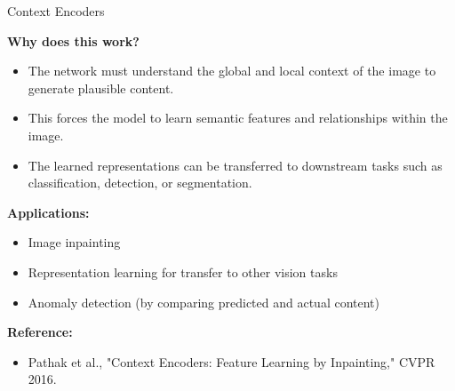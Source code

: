 \begin{frame}[allowframebreaks]{Context Encoders}
    \framebreak

    \vspace{0.5em}
    \textbf{Why does this work?}
    \begin{itemize}
        \setlength{\itemsep}{-0.25em}
        \item The network must understand the global and local context of the image to generate plausible content.
        \item This forces the model to learn semantic features and relationships within the image.
        \item The learned representations can be transferred to downstream tasks such as classification, detection, or segmentation.
    \end{itemize}

    \vspace{0.5em}
    \textbf{Applications:}
    \begin{itemize}
        \setlength{\itemsep}{-0.25em}
        \item Image inpainting
        \item Representation learning for transfer to other vision tasks
        \item Anomaly detection (by comparing predicted and actual content)
    \end{itemize}

    \vspace{0.5em}
    \textbf{Reference:}
    \begin{itemize}
        \item Pathak et al., "Context Encoders: Feature Learning by Inpainting," CVPR 2016.
    \end{itemize}
\end{frame}